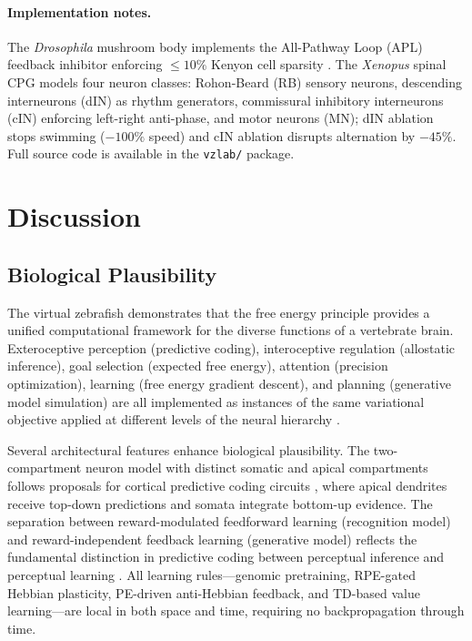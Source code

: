 \documentclass[12pt]{article}
\begin{document}
\paragraph{Implementation notes.}
The \textit{Drosophila} mushroom body implements the All-Pathway Loop
(APL) feedback inhibitor enforcing $\le 10\%$ Kenyon cell sparsity
\citep{lin2014}.
The \textit{Xenopus} spinal CPG \citep{roberts1998,li2006} models four
neuron classes: Rohon-Beard (RB) sensory neurons, descending interneurons
(dIN) as rhythm generators, commissural inhibitory interneurons (cIN)
enforcing left-right anti-phase, and motor neurons (MN);
dIN ablation stops swimming ($-100\%$ speed) and cIN ablation disrupts
alternation by $-45\%$.
Full source code is available in the \texttt{vzlab/} package.

\section{Discussion}\label{sec:discussion}

\subsection{Biological Plausibility}

The virtual zebrafish demonstrates that the free energy principle
provides a unified computational framework for the diverse functions
of a vertebrate brain.
Exteroceptive perception (predictive coding), interoceptive regulation
(allostatic inference), goal selection (expected free energy), attention
(precision optimization), learning (free energy gradient descent), and
planning (generative model simulation) are all implemented as instances
of the same variational objective applied at different levels of the
neural hierarchy \citep{friston2010,parr2022}.

Several architectural features enhance biological plausibility.
The two-compartment neuron model with distinct somatic and apical
compartments follows proposals for cortical predictive coding circuits
\citep{sacramento2018}, where apical dendrites receive top-down
predictions and somata integrate bottom-up evidence.
The separation between reward-modulated feedforward learning
(recognition model) and reward-independent feedback learning
(generative model) reflects the fundamental distinction in predictive
coding between perceptual inference and perceptual
learning \citep{rao1999,clark2013}.
All learning rules---genomic pretraining, RPE-gated Hebbian plasticity,
PE-driven anti-Hebbian feedback, and TD-based value learning---are
local in both space and time, requiring no backpropagation through time.
\end{document}
